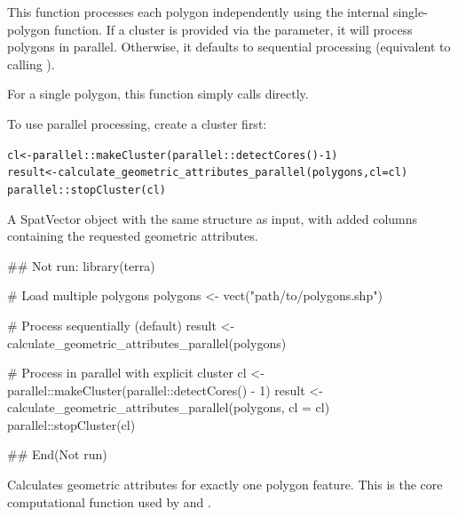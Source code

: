 \documentclass[letterpaper]{book}
\begin{document}
\begin{Details}
This function processes each polygon independently using the internal
single-polygon function. If a cluster is provided via the 
parameter, it will process polygons in parallel. Otherwise, it defaults to
sequential processing (equivalent to calling ).

For a single polygon, this function simply calls
 directly.

To use parallel processing, create a cluster first:

\begin{alltt}cl <- parallel::makeCluster(parallel::detectCores() - 1)
result <- calculate_geometric_attributes_parallel(polygons, cl = cl)
parallel::stopCluster(cl)
\end{alltt}

\end{Details}
%
\begin{Value}
A SpatVector object with the same structure as input, with added
columns containing the requested geometric attributes.
\end{Value}
%
\begin{Examples}
\begin{ExampleCode}
## Not run: 
library(terra)

# Load multiple polygons
polygons <- vect("path/to/polygons.shp")

# Process sequentially (default)
result <- calculate_geometric_attributes_parallel(polygons)

# Process in parallel with explicit cluster
cl <- parallel::makeCluster(parallel::detectCores() - 1)
result <- calculate_geometric_attributes_parallel(polygons, cl = cl)
parallel::stopCluster(cl)

## End(Not run)
\end{ExampleCode}
\end{Examples}
%
\begin{Description}
Calculates geometric attributes for exactly one polygon feature. This is the
core computational function used by  and
.
\end{Description}
\end{document}
